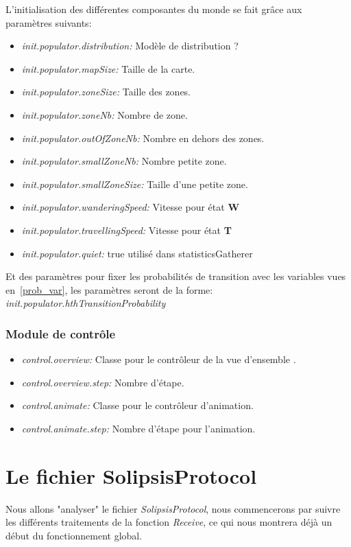 \documentclass[11pt,a4paper]{article}
\begin{document}
L'initialisation des différentes composantes du monde se fait grâce aux paramètres suivants:
\begin{itemize}
        \renewcommand{\labelitemi}{$\bullet$}
	\item \textit{init.populator.distribution:} Modèle de distribution ?
	\item \textit{init.populator.mapSize:} Taille de la carte.
	\item \textit{init.populator.zoneSize:} Taille des zones.
	\item \textit{init.populator.zoneNb:} Nombre de zone.
	\item \textit{init.populator.outOfZoneNb:} Nombre en dehors des zones.
	\item \textit{init.populator.smallZoneNb:} Nombre petite zone.
	\item \textit{init.populator.smallZoneSize:} Taille d'une petite zone.
	\item \textit{init.populator.wanderingSpeed:} Vitesse pour état \textbf{W}
	\item \textit{init.populator.travellingSpeed:} Vitesse pour état \textbf{T} 
	\item \textit{init.populator.quiet:} true  utilisé dans statisticsGatherer
\end{itemize}
Et des paramètres pour fixer les probabilités de transition avec les variables vues en~\ref{prob_var}, les paramètres seront de la forme: \textit{init.populator.hthTransitionProbability} 

\subsubsection{Module de contrôle}
\begin{itemize}
        \renewcommand{\labelitemi}{$\bullet$}
	\item \textit{control.overview:} Classe pour le contrôleur de la vue d'ensemble .
	\item \textit{control.overview.step:} Nombre d'étape.
	\item \textit{control.animate:} Classe pour le contrôleur d'animation.
	\item \textit{control.animate.step:} Nombre d'étape pour l'animation.
\end{itemize}

\section{Le fichier SolipsisProtocol}
Nous allons "analyser" le fichier \textit{SolipsisProtocol}, nous commencerons par suivre les différents traitements de la fonction \textit{Receive}, ce qui nous montrera déjà un début du fonctionnement global. 
\end{document}
